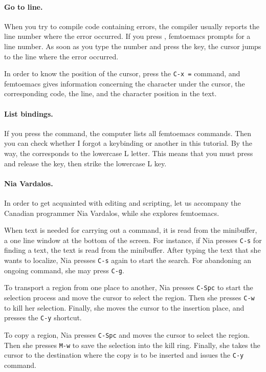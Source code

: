\documentclass[a4paper,12pt]{book}
\begin{document}
\paragraph{Go to line.} When you try to compile
code containing errors, the compiler
usually reports the line number where the error occurred.
If you press , femtoemacs
prompts for a line number. As soon as you
type the number and press the 
key, the cursor jumps to the line where the
error occurred.

In order to know the position of the cursor,
press the \verb|C-x =| command,
and femtoemacs gives information concerning
the character under the
cursor, the corresponding code, the line,
and the character position in the text.

\paragraph{List bindings.} If you press
the  command, the computer
lists all femtoemacs commands. Then you
can check whether I forgot a keybinding or
another in this tutorial. By the way,
the  corresponds to the lowercase L
letter. This means that you must press
and release the  key, then
strike the lowercase L key.

\paragraph{Nia Vardalos.}
In order to get acquainted with editing and scripting,
let us accompany the Canadian programmer Nia
Vardalos, while she explores femtoemacs.

When text is needed for carrying out a command,
it is read from the minibuffer, a one line
window at the bottom of the screen. For instance, 
if Nia presses \verb|C-s| for finding a text, 
the text is read from the minibuffer. After
typing the text that she wants to localize,
Nia presses \verb|C-s| again to start the search.
For abandoning an ongoing command, she may press \verb|C-g|.

To transport a region from one place to another,
Nia presses \verb|C-Spc| to start
 the selection process 
 and move the cursor to select the region. 
 Then she presses \verb|C-w| to
kill her selection. Finally, she moves
the cursor to the insertion place,
and presses the \verb|C-y| shortcut.

To copy a region, Nia presses \verb|C-Spc| and moves the cursor to select the region.
Then she presses \verb|M-w| to save the selection into the kill ring. Finally,
she takes the cursor to the destination where the copy is to be inserted and
issues the \verb|C-y| command.
\end{document}
